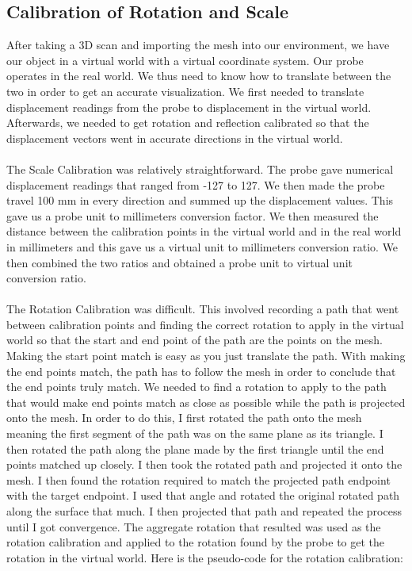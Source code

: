 \documentclass[conference]{acmsiggraph}
\begin{document}
\subsection{Calibration of Rotation and Scale}

After taking a 3D scan and importing the mesh into our environment, we have our object in a virtual world with a virtual coordinate system. Our probe operates in the real world. We thus need to know how to translate between the two in order to get an accurate visualization. We first needed to translate displacement readings from the probe to displacement in the virtual world. Afterwards, we needed to get rotation and reflection calibrated so that the displacement vectors went in accurate directions in the virtual world. \\
\\
The Scale Calibration was relatively straightforward. The probe gave numerical displacement readings that ranged from -127 to 127. We then made the probe travel 100 mm in every direction and summed up the displacement values. This gave us a probe unit to millimeters conversion factor. We then measured the distance between the calibration points in the virtual world and in the real world in millimeters and this gave us a virtual unit to millimeters conversion ratio. We then combined the two ratios and obtained a probe unit to virtual unit conversion ratio. \\
\\
The Rotation Calibration was difficult. This involved recording a path that went between calibration points and finding the correct rotation to apply in the virtual world so that the start and end point of the path are the points on the mesh. Making the start point match is easy as you just translate the path. With making the end points match, the path has to follow the mesh in order to conclude that the end points truly match. We needed to find a rotation to apply to the path that would make end points match as close as possible while the path is projected onto the mesh. In order to do this, I first rotated the path onto the mesh meaning the first segment of the path was on the same plane as its triangle. I then rotated the path along the plane made by the first triangle until the end points matched up closely. I then took the rotated path and projected it onto the mesh. I then found the rotation required to match the projected path endpoint with the target endpoint. I used that angle and rotated the original rotated path along the surface that much. I then projected that path and repeated the process until I got convergence. The aggregate rotation that resulted was used as the rotation calibration and applied to the rotation found by the probe to get the rotation in the virtual world. Here is the pseudo-code for the rotation calibration:
\end{document}
